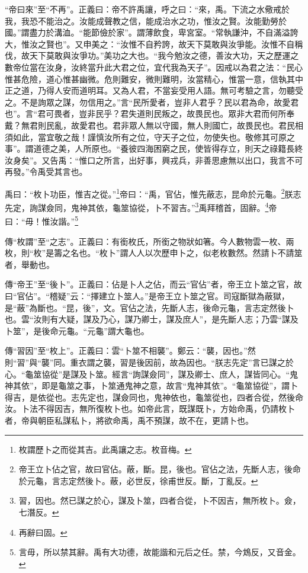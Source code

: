 {\noindent\shu{}\fzkt “帝曰來”至“不再”。正義曰：帝不許禹讓，呼之曰：“來，禹。下流之水儆戒於我，我恐不能治之。汝能成聲教之信，能成治水之功，惟汝之賢。汝能勤勞於國。”謂盡力於溝洫。“能節儉於家”。謂薄飲食，卑宮室。“常執謙沖，不自滿溢誇大，惟汝之賢也”。又申美之：“汝惟不自矜誇，故天下莫敢與汝爭能。汝惟不自稱伐，故天下莫敢與汝爭功。”美功之大也。“我今勉汝之德，善汝大功，天之歷運之數帝位當在汝身，汝終當升此大君之位，宜代我為天子”。因戒以為君之法：“民心惟甚危險，道心惟甚幽微。危則難安，微則難明，汝當精心，惟當一意，信執其中正之道，乃得人安而道明耳。又為人君，不當妄受用人語。無可考驗之言，勿聽受之。不是詢眾之謀，勿信用之。”言“民所愛者，豈非人君乎？民以君為命，故愛君也”。言“君可畏者，豈非民乎？君失道則民叛之，故畏民也。眾非大君而何所奉戴？無君則民亂，故愛君也。君非眾人無以守國，無人則國亡，故畏民也。君民相須如此，當宜敬之哉！謹慎汝所有之位，守天子之位，勿使失也。敬修其可原之事”。謂道德之美，人所原也。“養彼四海困窮之民，使皆得存立，則天之祿籍長終汝身矣”。又告禹：“惟口之所言，出好事，興戎兵，非善思慮無以出口，我言不可再發。”令禹受其言也。 \par}

禹曰：“枚卜功臣，惟吉之從。”\footnote{枚謂歷卜之而從其吉。此禹讓之志。枚音梅。}帝曰：“禹，官佔，惟先蔽志，昆命於元龜。\footnote{帝王立卜佔之官，故曰官佔。蔽，斷。昆，後也。官佔之法，先斷人志，後命於元龜，言志定然後卜。蔽，必世反，徐甫世反。斷，丁亂反。}朕志先定，詢謀僉同，鬼神其依，龜筮協從，卜不習吉。”\footnote{習，因也。然已謀之於心，謀及卜筮，四者合從，卜不因吉，無所枚卜。僉，七潛反。}禹拜稽首，固辭。\footnote{再辭曰固。}帝曰：“毋！惟汝諧。”\footnote{言毋，所以禁其辭。禹有大功德，故能諧和元后之任。禁，今鴆反，又音金。}

{\noindent\zhuan{}\fzbyks 傳“枚謂”至“之志”。正義曰：有銜枚氏，所銜之物狀如箸。今人數物雲一枚、兩枚，則“枚”是籌之名也。“枚卜”謂人人以次歷申卜之，似老枚數然。然請卜不請筮者，舉動也。 \par}

{\noindent\zhuan{}\fzbyks 傳“帝王”至“後卜”。正義曰：佔是卜人之佔，而云“官佔”者，帝王立卜筮之官，故曰“官佔”。“稽疑”云：“擇建立卜筮人。”是帝王立卜筮之官。司寇斷獄為蔽獄，是“蔽”為斷也。“昆，後”，文。官佔之法，先斷人志，後命元龜，言志定然後卜也。雲“汝則有大疑，謀及乃心，謀乃卿士，謀及庶人”，是先斷人志；乃雲“謀及卜筮”，是後命元龜。“元龜”謂大龜也。 \par}

{\noindent\zhuan{}\fzbyks 傳“習因”至“枚上”。正義曰：雲“卜筮不相襲”。鄭云：“襲，因也。”然則“習”與“襲”同。重衣謂之襲，習是後因前，故為因也。“朕志先定”言已謀之於心。“龜筮協從”是謀及卜筮。經言“詢謀僉同”，謀及卿士、庶人，謀皆同心。“鬼神其依”，即是龜筮之事，卜筮通鬼神之意，故言“鬼神其依”。“龜筮協從”，謂卜得吉，是依從也。志先定也，謀僉同也，鬼神依也，龜筮從也，四者合從，然後命汝。卜法不得因吉，無所復枚卜也。如帝此言，既謀既卜，方始命禹，仍請枚卜者，帝與朝臣私謀私卜，將欲命禹，禹不預謀，故不在，更請卜也。 \par}

